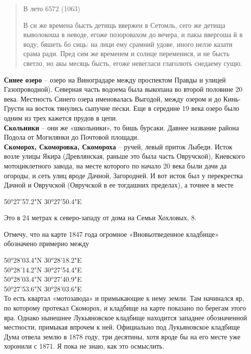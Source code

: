 \begin{quotation}
В лето 6572 (1063)

В си же времена бысть детищь ввержен в Сетомль, сего же детища выволокоша в неводе, егоже позоровахом до вечера, и пакы ввергоша й в воду; бяшеть бо сиць: на лици ему срамний удове, иного нелзе казати срама ради. Пред сим же временем и солнце переменися, и не бысть светло, но акы месяць бысть, егоже невегласи глаголють снедаему сущю.
\end{quotation}

\textbf{Синее озеро} – озеро на Виноградаре между проспектом Правды и улицей Газопроводной). Северная часть водоема была выкопана во второй половине 20 века. Местность Синего озера именовалась Выгодой, между озером и до Кинь-Грусти на восток тянулись сыпучие пески. Еще в середине 19 века озеро было одним из трех кажется прудов в цепи.\\

\textbf{Скольники} – они же «школьники», то бишь бурсаки. Давнее название района Подола от Могилянки до Почтовой площади.\\

\textbf{Скоморох, Скоморовка, Скомороха} – ручей, левый приток Лыбеди. Исток возле улицы Якира (Древлянская, раньше это была часть Овручской), Киевского мотоциклетного завода, на месте которого по начало 20 века были дачи да огороды, и сеть улиц вроде Дачной, Загородней. И вот исток был у перекрестка Дачной и Овручской (Овручской в ее тогдашних пределах), а точнее в месте 

50°27'57.2"N 30°27'50.4"E

Это в 24 метрах к северо-западу от дома на Семьи Хохловых, 8.

Отмечу, что на карте 1847 года огромное «Вновьотведенное кладбище» обозначено примерно между 

50°28'03.4"N 30°28'18.2"E\\
50°28'14.2"N 30°27'54.4"E\\
50°28'03.4"N 30°27'40.9"E\\
50°27'53.6"N 30°28'03.6"E\\

То есть квартал «мотозавода» и примыкающие к нему земли. Там начинался яр, по которому протекал Скоморох, и кладбище на карте показано по берегам этого яра. Однако нынешнее Лукьяновское кладбище находится западнее обозначенной местности, примыкая впрочем к ней. Официально под Лукьяновское кладбище Дума отвела землю в 1878 году, три десятины, хотя вроде бы на его месте уже хоронили с 1871. Я пока не знаю, как это осмыслить.

